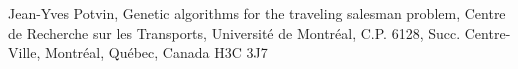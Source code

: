 \documentclass[letterpaper, 10 pt, conference]{ieeeconf}  %
\begin{document}
\begin{figure}[ht!]
\begin{center}
{        }%
%
    \end{center}
   \label{fig:subfigures}
\end{figure}



\clearpage 
\begin{thebibliography}{99}
 Jean-Yves Potvin, Genetic algorithms for the
traveling salesman problem,
Centre de Recherche sur les Transports, Université de Montréal,
C.P. 6128, Succ. Centre-Ville, Montréal, Québec, Canada H3C 3J7 
\end{thebibliography}
\end{document}
